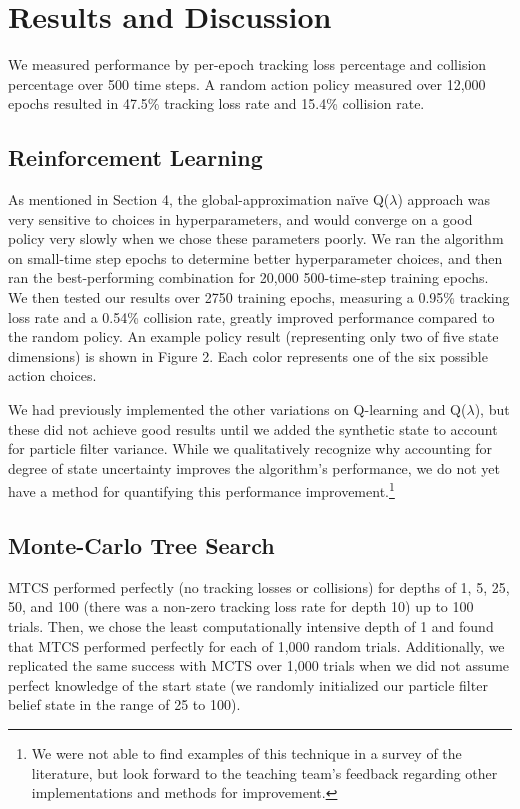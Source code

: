 \documentclass{article}
\begin{document}
\section{Results and Discussion}
\par We measured performance by per-epoch tracking loss percentage and collision percentage over 500 time steps. A random action policy measured over 12,000 epochs resulted in 47.5\% tracking loss rate and 15.4\% collision rate.

\subsection{Reinforcement Learning}
\par As mentioned in Section 4, the global-approximation naïve Q($\lambda$) approach was very sensitive to choices in hyperparameters, and would converge on a good policy very slowly when we chose these parameters poorly. We ran the algorithm on small-time step epochs to determine better hyperparameter choices, and then ran the best-performing combination for 20,000 500-time-step training epochs. We then tested our results over 2750 training epochs, measuring a 0.95\% tracking loss rate and a 0.54\% collision rate, greatly improved performance compared to the random policy. An example policy result (representing only two of five state dimensions) is shown in Figure 2. Each color represents one of the six possible action choices.


\par We had previously implemented the other variations on Q-learning and Q($\lambda$), but these did not achieve good results until we added the synthetic state to account for particle filter variance. While we qualitatively recognize why accounting for degree of state uncertainty improves the algorithm's performance, we do not yet have a method for quantifying this performance improvement.\footnote{We were not able to find examples of this technique in a survey of the literature, but look forward to the teaching team's feedback regarding other implementations and methods for improvement.}

\subsection{Monte-Carlo Tree Search}
\par MTCS performed perfectly (no tracking losses or collisions) for depths of 1, 5, 25, 50, and 100 (there was a non-zero tracking loss rate for depth 10) up to 100 trials. Then, we chose the least computationally intensive depth of 1 and found that MTCS performed perfectly for each of 1,000 random trials. Additionally, we replicated the same success with MCTS over 1,000 trials when we did not assume perfect knowledge of the start state (we randomly initialized our particle filter belief state in the range of 25 to 100).
\end{document}

